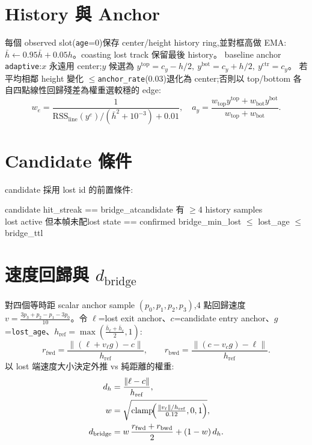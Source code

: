 \section{History 與 Anchor}\label{sec:rl-anchor}
每個 observed slot(\texttt{age}=0)保存 center/height history ring,並對框高做 EMA:
\(\bar{h}\leftarrow0.95\bar{h}+0.05h\)。coasting lost track 保留最後 history。
baseline anchor \texttt{adaptive}:\(x\) 永遠用 center;\(y\) 候選為
\(y^{\mathrm{top}}{=}c_y{-}h/2,\ y^{\mathrm{bot}}{=}c_y{+}h/2,\ y^{\mathrm{ctr}}{=}c_y\)。
若平均相鄰 height 變化 \(\le\)\texttt{anchor\_rate}(0.03)退化為 center;否則以 top/bottom
各自四點線性回歸殘差為權重選較穩的 edge:
\begin{equation}\label{eq:rl-anchor}
  w_e=\frac{1}{\mathrm{RSS}_{\mathrm{line}}(y^e)/(\bar{h}^2+10^{-3})+0.01},\quad
  a_y=\frac{w_{\mathrm{top}}y^{\mathrm{top}}+w_{\mathrm{bot}}y^{\mathrm{bot}}}
           {w_{\mathrm{top}}+w_{\mathrm{bot}}}.
\end{equation}

\section{Candidate 條件}\label{sec:rl-cand}
candidate 採用 lost id 的前置條件:
\begin{center}\ttfamily\small
candidate hit\_streak == bridge\_at\quad candidate 有 $\ge$4 history samples\\
lost active 但本幀未配\quad lost state == confirmed\quad
bridge\_min\_lost $\le$ lost\_age $\le$ bridge\_ttl
\end{center}

\section{速度回歸與 \texorpdfstring{\(d_{\mathrm{bridge}}\)}{d\_bridge}}\label{sec:rl-bridge}
對四個等時距 scalar anchor sample \((p_0,p_1,p_2,p_3)\),4 點回歸速度
\(v=\tfrac{3p_3+p_2-p_1-3p_0}{10}\)。令 \(\ell\)=lost exit anchor、\(c\)=candidate
entry anchor、\(g\)=\texttt{lost\_age}、\(h_{\mathrm{ref}}=\max(\tfrac{\bar{h}_\ell+\bar{h}_c}{2},1)\):
\begin{equation}\label{eq:rl-resid}
  r_{\mathrm{fwd}}=\frac{\lVert(\ell+v_\ell g)-c\rVert}{h_{\mathrm{ref}}},\qquad
  r_{\mathrm{bwd}}=\frac{\lVert(c-v_c g)-\ell\rVert}{h_{\mathrm{ref}}}.
\end{equation}
以 lost 端速度大小決定外推 vs 純距離的權重:
\begin{align}\label{eq:rl-dbridge}
  d_h&=\frac{\lVert\ell-c\rVert}{h_{\mathrm{ref}}},\\
  w&=\sqrt{\mathrm{clamp}\!\Bigl(\tfrac{\lVert v_\ell\rVert/h_{\mathrm{ref}}}{0.12},0,1\Bigr)},\\
  d_{\mathrm{bridge}}&=
  w\,\frac{r_{\mathrm{fwd}}+r_{\mathrm{bwd}}}{2}+(1-w)\,d_h.
\end{align}

